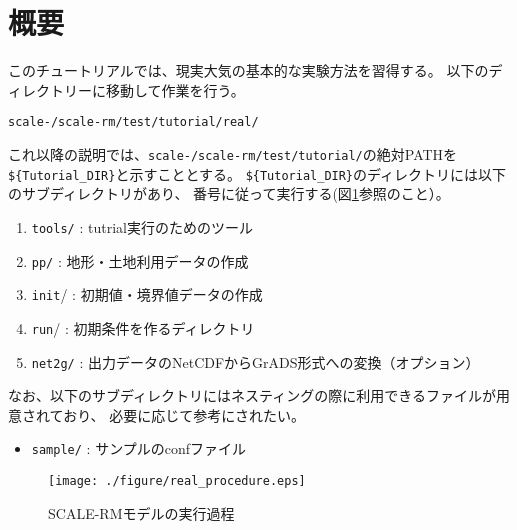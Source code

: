 \section{概要}
このチュートリアルでは、現実大気の基本的な実験方法を習得する。
以下のディレクトリーに移動して作業を行う。
\begin{alltt}
 scale-{\version}/scale-rm/test/tutorial/real/
\end{alltt}
これ以降の説明では、\texttt{scale-{\version}/scale-rm/test/tutorial/}の絶対PATHを
\verb|${Tutorial_DIR}|と示すこととする。
\verb|${Tutorial_DIR}|のディレクトリには以下のサブディレクトリがあり、
番号に従って実行する(図\ref{fig:howto}参照のこと）。
\begin{enumerate}
\item  \texttt{tools/}   : tutrial実行のためのツール
\item  \texttt{pp/}      : 地形・土地利用データの作成
\item  \texttt{init}/    : 初期値・境界値データの作成
\item  \texttt{run}/     : 初期条件を作るディレクトリ
\item  \texttt{net2g/}   : 出力データのNetCDFからGrADS形式への変換（オプション） 
\end{enumerate}
なお、以下のサブディレクトリにはネスティングの際に利用できるファイルが用意されており、
必要に応じて参考にされたい。
\begin{itemize}
\item  \texttt{sample/}  : サンプルのconfファイル
\end{itemize}


\begin{figure}[b]
\begin{center}
  \texttt{[image: ./figure/real\_procedure.eps]}\\
  \caption{SCALE-RMモデルの実行過程}
  \label{fig:howto}
\end{center}
\end{figure}

